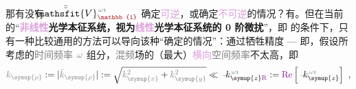 那有没有 $\Xint{\mathcolor{gray}{-}}{25}{\bar{\bar{\mathsfit{V}}}}^{\;\! \mathcolor{gray}{\omega} \textcolor{PineGreen}{\imath}}_{\textcolor{Maroon}{\mathbb{1}}}$ 确定\textcolor{Plum}{可逆}，或确定\textcolor{Plum}{不可逆}的情况？有。但在当前的“\textbf{\textcolor{Plum}{非线性}\textcolor{NavyBlue}{光学}\textcolor{PineGreen}{本征系统}，视为\textcolor{Plum}{线性}\textcolor{NavyBlue}{光学}\textcolor{PineGreen}{本征系统}的 \textcolor{NavyBlue}{0 阶微扰}}”，即  的条件下，只有一种比较通用的方法可以导向该种“确定的情况”：通过牺牲精度 --- 即，假设所考虑的\textcolor{gray}{时间频率} $\mathcolor{gray}{\omega}$ 组分，\textcolor{gray}{混频}场的（最大）\textcolor{Plum}{横向}\textcolor{gray}{空间频率}不太高，即
\begin{align} \label{eq:k_rho<<k_z}
	\mathcolor{gray}{k_{\symup{\rho}}} := \lvert \mathcolor{gray}{\bar{k}_{\symup{\rho}}} \rvert := \sqrt{ \mathcolor{gray}{k^2_{\symup{x}}} + \mathcolor{gray}{k^2_{\symup{y}}} } \ll \Xint{\begin{smallmatrix} ~ \\ {}^{}_{\mathcolor{gray}{-}} \\ ~ \end{smallmatrix}}{15}{k}_{\symup{z} \textcolor{Plum}{\text{R}}}^{\;\! \mathcolor{gray}{\omega} \textcolor{PineGreen}{\imath}} := \textcolor{Plum}{\text{Re}} \left[ \Xint{\begin{smallmatrix} ~ \\ {}^{}_{\mathcolor{gray}{-}} \\ ~ \end{smallmatrix}}{15}{k}_{\symup{z}}^{\;\! \mathcolor{gray}{\omega} \textcolor{PineGreen}{\imath}} \right] ~,
\end{align}
